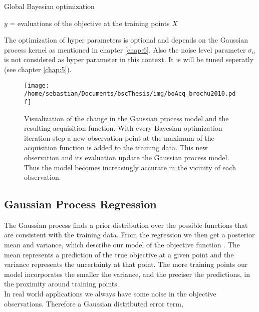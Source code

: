 \begin{algorithm}
    \caption{Global Bayesian optimization\label{alg:boGlob}}
    \BlankLine

    $y$ = evaluations of the objective at the training points $X$\\
\end{algorithm}

The optimization of hyper parameters is optional and depends on the Gaussian process kernel as mentioned in chapter \ref{chap:6}. Also the noise level parameter $\sigma_n$ is not considered as hyper parameter in this context. It is will be tuned seperatly (see chapter \ref{chap:5}).

\begin{figure}[h]
    \centering
    \texttt{[image: /home/sebastian/Documents/bscThesis/img/boAcq\_brochu2010.pdf]}
    \caption{Visualization of the change in the Gaussian process model and the resulting acquisition function. With every Bayesian optimization iteration step a new observation point at the maximum of the acquisition function is added to the training data. This new observation and its evaluation update the Gaussian process model. Thus the model becomes increasingly accurate in the vicinity of each observation. \cite{brochu2010tutorial} \label{fig:acqBO}}
\end{figure}

\subsection{Gaussian Process Regression}
The Gaussian process finds a prior distribution over the possible functions that are consistent with the training data. From the regression we then get a posterior mean and variance, which describe our model of the objective function \cite{rasmussen2006gaussian}. The mean represents a prediction of the true objective at a given point and the variance represents the uncertainty at that point. The more training points our model incorporates the smaller the variance, and the preciser the predictions, in the proximity around training points.\\
In real world applications we always have some noise in the objective observations. Therefore a Gaussian distributed error term,

